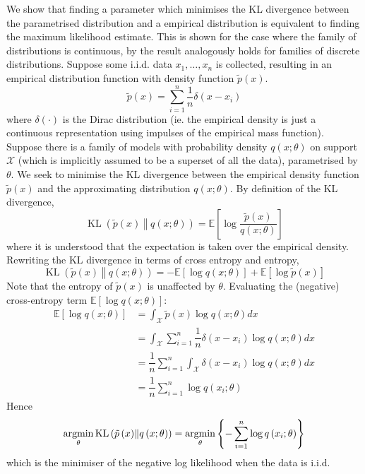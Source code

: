 \documentclass[11pt]{report} %
\begin{document}
We show that finding a parameter which minimises the KL divergence between the parametrised distribution and a empirical distribution is equivalent to finding the maximum likelihood estimate. This is shown for the case where the family of distributions is continuous, by the result analogously holds for families of discrete distributions. Suppose some i.i.d. data $x_{1}, \dots, x_{n}$ is collected, resulting in an empirical distribution function with density function $\tilde{p}\left(x\right)$.
\begin{equation}
\tilde{p}\left(x\right) = \sum_{i = 1}^{n}\dfrac{1}{n}\delta\left(x - x_{i}\right)
\end{equation}
where $\delta\left(\cdot\right)$ is the Dirac distribution (ie. the empirical density is just a continuous representation using impulses of the empirical mass function). Suppose there is a family of models with probability density $q\left(x;\theta\right)$ on support $\mathcal{X}$ (which is implicitly assumed to be a superset of all the data), parametrised by $\theta$. We seek to minimise the KL divergence between the empirical density function $\tilde{p}\left(x\right)$ and the approximating distribution $q\left(x;\theta\right)$. By definition of the KL divergence,
\begin{equation}
\operatorname{KL}\left(\tilde{p}\left(x\right)\middle\Vert q\left(x;\theta\right)\right) = \mathbb{E}\left[\log\dfrac{\tilde{p}\left(x\right)}{q\left(x;\theta\right)}\right]
\end{equation}
where it is understood that the expectation is taken over the empirical density. Rewriting the KL divergence in terms of cross entropy and entropy,
\begin{equation}
\operatorname{KL}\left(\tilde{p}\left(x\right)\middle\Vert q\left(x;\theta\right)\right) = -\mathbb{E}\left[\log q\left(x;\theta\right)\right] + \mathbb{E}\left[\log \tilde{p}\left(x\right)\right]
\end{equation}
Note that the entropy of $\tilde{p}\left(x\right)$ is unaffected by $\theta$. Evaluating the (negative) cross-entropy term $\mathbb{E}\left[\log q\left(x;\theta\right)\right]$:
\begin{align}
\mathbb{E}\left[\log q\left(x;\theta\right)\right] &= \int_{\mathcal{X}}\tilde{p}\left(x\right)\log q\left(x;\theta\right)dx \\
&= \int_{\mathcal{X}}\sum_{i = 1}^{n}\dfrac{1}{n}\delta\left(x - x_{i}\right)\log q\left(x;\theta\right)dx \\
&= \dfrac{1}{n}\sum_{i = 1}^{n}\int_{\mathcal{X}}\delta\left(x - x_{i}\right)\log q\left(x;\theta\right)dx \\
&= \dfrac{1}{n}\sum_{i = 1}^{n}\log q\left(x_{i};\theta\right)
\end{align}
Hence
\begin{equation}
\operatorname*{argmin}_{\theta}\operatorname{KL}\left(\tilde{p}\left(x\right)\middle\Vert q\left(x;\theta\right)\right) = \operatorname*{argmin}_{\theta}\left\{-\sum_{i = 1}^{n}\log q\left(x_{i};\theta\right)\right\}
\end{equation}
which is the minimiser of the negative log likelihood when the data is i.i.d.
\end{document}
